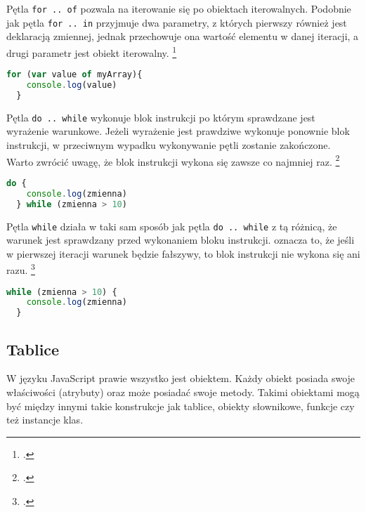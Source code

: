 \par Pętla \texttt{for .. of} pozwala na iterowanie się po obiektach iterowalnych. Podobnie jak pętla \texttt{for .. in} przyjmuje dwa parametry, z których pierwszy również jest deklaracją zmiennej, jednak przechowuje ona wartość elementu w danej iteracji, a drugi parametr jest obiekt iterowalny. \footcite{jsLoops_and_iteration}

\begin{lstlisting}[language=JavaScript, caption=Przykład użycia instrukcji \texttt{for .. of}, label=alg:instrukcjaFor3]
  for (var value of myArray){
    console.log(value)
  }
\end{lstlisting}

\par Pętla \texttt{do .. while} wykonuje blok instrukcji po którym sprawdzane jest wyrażenie warunkowe. Jeżeli wyrażenie jest prawdziwe wykonuje ponownie blok instrukcji, w przeciwnym wypadku wykonywanie pętli zostanie zakończone. Warto zwrócić uwagę, że blok instrukcji wykona się zawsze co najmniej raz. \footcite{jsLoops_and_iteration}

\begin{lstlisting}[language=JavaScript, caption=Przykład użycia instrukcji \texttt{do .. while}, label=alg:instrukcjaWhile1]
  do {
    console.log(zmienna)
  } while (zmienna > 10)
\end{lstlisting}

\par Pętla \texttt{while} działa w taki sam sposób jak pętla \texttt{do .. while} z tą różnicą, że warunek jest sprawdzany przed wykonaniem bloku instrukcji. oznacza to, że jeśli w pierwszej iteracji warunek będzie fałszywy, to blok instrukcji nie wykona się ani razu. \footcite{jsLoops_and_iteration}

\begin{lstlisting}[language=JavaScript, caption=Przykład użycia instrukcji \texttt{while}, label=alg:instrukcjaWhile2]
  while (zmienna > 10) {
    console.log(zmienna)
  }
\end{lstlisting}


\subsection{Tablice}
\par W języku JavaScript prawie wszystko jest obiektem. Każdy obiekt posiada swoje właściwości (atrybuty) oraz może posiadać swoje metody. Takimi obiektami mogą być między innymi takie konstrukcje jak tablice, obiekty słownikowe, funkcje czy też instancje klas.

